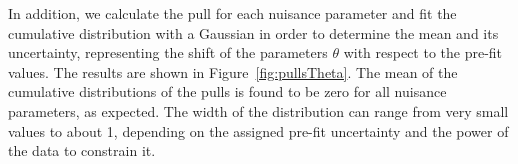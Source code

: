 In addition, we calculate the pull for each nuisance parameter and fit the cumulative distribution with a Gaussian in order to determine the mean and its uncertainty, representing the shift of the parameters $\theta$ with respect to the pre-fit values. The results are shown in Figure~\ref{fig:pullsTheta}. The mean of the cumulative distributions of the pulls is found to be zero for all nuisance parameters, as expected. The width of the distribution can range from very small values to about 1, depending on the assigned pre-fit uncertainty and the power of the data to constrain it.
\begin{figure}[h!]
\centering
{}
\\

\end{figure}
